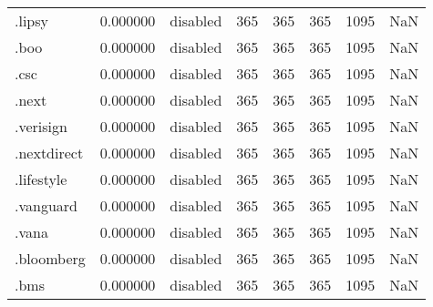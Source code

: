 \begin{tabular}{lrlrrrrl}
.lipsy                    &          0.000000 &        disabled &                         365 &                         365 &                         365 &                1095 &                  NaN \\
.boo                      &          0.000000 &        disabled &                         365 &                         365 &                         365 &                1095 &                  NaN \\
.csc                      &          0.000000 &        disabled &                         365 &                         365 &                         365 &                1095 &                  NaN \\
.next                     &          0.000000 &        disabled &                         365 &                         365 &                         365 &                1095 &                  NaN \\
.verisign                 &          0.000000 &        disabled &                         365 &                         365 &                         365 &                1095 &                  NaN \\
.nextdirect               &          0.000000 &        disabled &                         365 &                         365 &                         365 &                1095 &                  NaN \\
.lifestyle                &          0.000000 &        disabled &                         365 &                         365 &                         365 &                1095 &                  NaN \\
.vanguard                 &          0.000000 &        disabled &                         365 &                         365 &                         365 &                1095 &                  NaN \\
.vana                     &          0.000000 &        disabled &                         365 &                         365 &                         365 &                1095 &                  NaN \\
.bloomberg                &          0.000000 &        disabled &                         365 &                         365 &                         365 &                1095 &                  NaN \\
.bms                      &          0.000000 &        disabled &                         365 &                         365 &                         365 &                1095 &                  NaN \\

\end{tabular}
